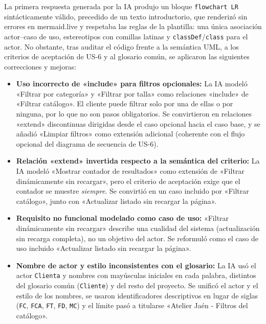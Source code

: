 La primera respuesta generada por la IA produjo un bloque \texttt{flowchart LR} sintácticamente válido, precedido de un texto introductorio, que renderizó sin errores en mermaid.live y respetaba las reglas de la plantilla: una única asociación actor--caso de uso, estereotipos con comillas latinas y \texttt{classDef}/\texttt{class} para el actor. No obstante, tras auditar el código frente a la semántica UML, a los criterios de aceptación de US-6 y al glosario común, se aplicaron las siguientes correcciones y mejoras:
\begin{itemize}[leftmargin=*,nosep]
\item \textbf{Uso incorrecto de «include» para filtros opcionales:} La IA modeló «Filtrar por categoría» y «Filtrar por talla» como relaciones «include» de «Filtrar catálogo». El cliente puede filtrar solo por una de ellas o por ninguna, por lo que no son pasos obligatorios. Se convirtieron en relaciones «extend» discontinuas dirigidas desde el caso opcional hacia el caso base, y se añadió «Limpiar filtros» como extensión adicional (coherente con el flujo opcional del diagrama de secuencia de US-6).
\item \textbf{Relación «extend» invertida respecto a la semántica del criterio:} La IA modeló «Mostrar contador de resultados» como extensión de «Filtrar dinámicamente sin recargar», pero el criterio de aceptación exige que el contador se muestre \emph{siempre}. Se convirtió en un caso incluido por «Filtrar catálogo», junto con «Actualizar listado sin recargar la página».
\item \textbf{Requisito no funcional modelado como caso de uso:} «Filtrar dinámicamente sin recargar» describe una cualidad del sistema (actualización sin recarga completa), no un objetivo del actor. Se reformuló como el caso de uso incluido «Actualizar listado sin recargar la página».
\item \textbf{Nombre de actor y estilo inconsistentes con el glosario:} La IA usó el actor \texttt{Clienta} y nombres con mayúsculas iniciales en cada palabra, distintos del glosario común (\texttt{Cliente}) y del resto del proyecto. Se unificó el actor y el estilo de los nombres, se usaron identificadores descriptivos en lugar de siglas (\texttt{FC}, \texttt{FCA}, \texttt{FT}, \texttt{FD}, \texttt{MC}) y el límite pasó a titularse «Atelier Jaén - Filtros del catálogo».
\end{itemize}
